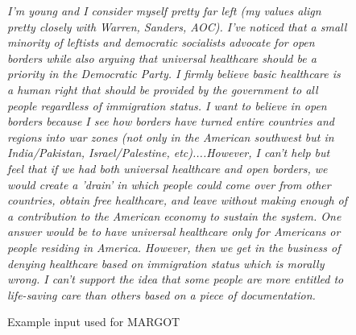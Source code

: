 \documentclass[12pt,a4paper]{article}
\begin{document}
\begin{figure}[H]
    \centering
    \emph{I'm young and I consider myself pretty far left (my values align pretty closely with Warren, Sanders, AOC). I've noticed that a small minority of leftists and democratic socialists advocate for open borders while also arguing that universal healthcare should be a priority in the Democratic Party. 
I firmly believe basic healthcare is a human right that should be provided by the government to all people regardless of immigration status. I want to believe in open borders because I see how borders have turned entire countries and regions into war zones (not only in the American southwest but in India/Pakistan, Israel/Palestine, etc)....However, I can't help but feel that if we had both universal healthcare and open borders, we would create a 'drain' in which people could come over from other countries, obtain free healthcare, and leave without making enough of a contribution to the American economy to sustain the system. 
One answer would be to have universal healthcare only for Americans or people residing in America. However, then we get in the business of denying healthcare based on immigration status which is morally wrong. I can't support the idea that some people are more entitled to life-saving care than others based on a piece of documentation.}
    \caption{Example input used for MARGOT}
    \label{fig:margotin}
\end{figure}
\end{document}
